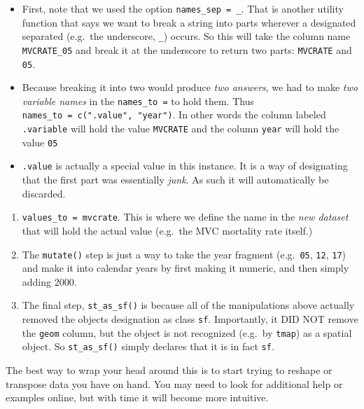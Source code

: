 \documentclass[
]{book}
\providecommand{\tightlist}{%
  \setlength{\itemsep}{0pt}\setlength{\parskip}{0pt}}
\begin{document}
\begin{itemize}
\tightlist
\item
  First, note that we used the option \texttt{names\_sep\ =\ \textquotesingle{}\_\textquotesingle{}}. That is another utility function that says we want to break a string into parts wherever a designated separated (e.g.~the underscore, \texttt{\_}) occurs. So this will take the column name \texttt{MVCRATE\_05} and break it at the underscore to return two parts: \texttt{MVCRATE} and \texttt{05}.
\item
  Because breaking it into two would produce \emph{two answers}, we had to make \emph{two variable names} in the \texttt{names\_to\ =} to hold them. Thus \texttt{names\_to\ =\ c(".value",\ "year")}. In other words the column labeled \texttt{.variable} will hold the value \texttt{MVCRATE} and the column \texttt{year} will hold the value \texttt{05}
\item
  \texttt{\textquotesingle{}.value\textquotesingle{}} is actually a special value in this instance. It is a way of designating that the first part was essentially \emph{junk}. As such it will automatically be discarded.
\end{itemize}

\begin{enumerate}
\def\labelenumi{\arabic{enumi}.}
\setcounter{enumi}{5}
\tightlist
\item
  \texttt{values\_to\ =\ \textquotesingle{}mvcrate\textquotesingle{}}. This is where we define the name in the \emph{new dataset} that will hold the actual value (e.g.~the MVC mortality rate itself.)
\item
  The \texttt{mutate()} step is just a way to take the year fragment (e.g.~\texttt{05}, \texttt{12}, \texttt{17}) and make it into calendar years by first making it numeric, and then simply adding 2000.
\item
  The final step, \texttt{st\_as\_sf()} is because all of the manipulations above actually removed the objects designation as class \texttt{sf}. Importantly, it DID NOT remove the \texttt{geom} column, but the object is not recognized (e.g.~by \texttt{tmap}) as a spatial object. So \texttt{st\_as\_sf()} simply declares that it is in fact \texttt{sf}.
\end{enumerate}

The best way to wrap your head around this is to start trying to reshape or transpose data you have on hand. You may need to look for additional help or examples online, but with time it will become more intuitive.
\end{document}
